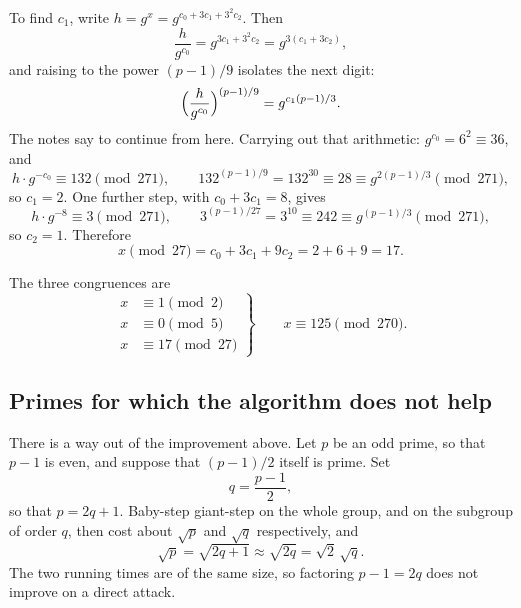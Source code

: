 \begin{example}[A smooth order: \(p=271\)]
To find \(c_1\), write \(h=g^x=g^{c_0+3c_1+3^2 c_2}\). Then
\[
    \frac{h}{g^{c_0}}
    = g^{3c_1+3^2 c_2}
    = g^{3(c_1+3c_2)},
\]
and raising to the power \((p-1)/9\) isolates the next digit:
\[
    \Bigl(\frac{h}{g^{c_0}}\Bigr)^{(p-1)/9}
    = g^{c_1(p-1)/3}.
\]
The notes say to continue from here. Carrying out that arithmetic:
\(g^{c_0}=6^2\equiv 36\), and
\[
    h\cdot g^{-c_0}\equiv 132\pmod{271},
    \qquad
    132^{(p-1)/9}=132^{30}\equiv 28
    \equiv g^{2(p-1)/3}\pmod{271},
\]
so \(c_1=2\). One further step, with \(c_0+3c_1=8\), gives
\[
    h\cdot g^{-8}\equiv 3\pmod{271},
    \qquad
    3^{(p-1)/27}=3^{10}\equiv 242
    \equiv g^{(p-1)/3}\pmod{271},
\]
so \(c_2=1\). Therefore
\[
    x\pmod{27}
    = c_0+3c_1+9c_2
    = 2+6+9
    = 17.
\]
\end{example}


The three congruences are
\[
    \left.
    \begin{aligned}
        x&\equiv 1 \pmod{2}\\
        x&\equiv 0 \pmod{5}\\
        x&\equiv 17\pmod{27}
    \end{aligned}
    \right\}
    \qquad
    x\equiv 125\pmod{270}.
\]

\subsection{Primes for which the algorithm does not help}

There is a way out of the improvement above. Let \(p\) be an odd prime, so
that \(p-1\) is even, and suppose that \((p-1)/2\) itself is prime. Set
\[
    q=\frac{p-1}{2},
\]
so that \(p=2q+1\). Baby-step giant-step on the whole group, and on the
subgroup of order \(q\), then cost about \(\sqrt{p}\) and \(\sqrt{q}\)
respectively, and
\[
    \sqrt{p}=\sqrt{2q+1}\approx\sqrt{2q}=\sqrt{2}\,\sqrt{q}.
\]
The two running times are of the same size, so factoring \(p-1=2q\) does
not improve on a direct attack.

